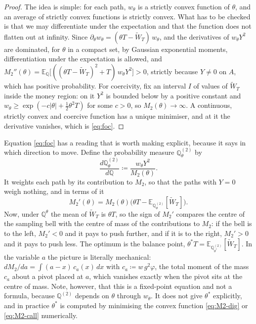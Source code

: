 \documentclass[11pt,a4paper]{article}
\theoremstyle{plain}
\theoremstyle{definition}
\theoremstyle{remark}
\newcommand{\E}{\mathbb{E}}
\newcommand{\Q}{\mathbb{Q}}
\newcommand{\1}{\mathbf{1}}
\newcommand{\eqdef}{\coloneqq}
\newcommand{\Wt}{\widetilde{W}}
\newcommand{\Qt}{\Q^{\theta}}
\begin{document}
\begin{proof}
The idea is simple: for each path, $w_\theta$ is a strictly convex function of $\theta$, and an average of strictly convex functions is strictly convex. What has to be checked is that we may differentiate under the expectation and that the function does not flatten out at infinity. Since $\partial_\theta w_\theta = (\theta T - \Wt_T)\, w_\theta$, and the derivatives of $w_\theta Y^2$ are dominated, for $\theta$ in a compact set, by Gaussian exponential moments, differentiation under the expectation is allowed, and $M_2''(\theta) = \E_\Q\bigl[((\theta T - \Wt_T)^2 + T)\, w_\theta Y^2\bigr] > 0$, strictly because $Y \ne 0$ on $A$, which has positive probability. For coercivity, fix an interval $I$ of values of $\Wt_T$ inside the money region: on it $Y^2$ is bounded below by a positive constant and $w_\theta \ge \exp(-c|\theta| + \tfrac12\theta^2 T)$ for some $c > 0$, so $M_2(\theta) \to \infty$. A continuous, strictly convex and coercive function has a unique minimiser, and at it the derivative vanishes, which is \eqref{eq:foc}.
\end{proof}

Equation \eqref{eq:foc} has a reading that is worth making explicit, because it says in which direction to move. Define the probability measure $\Q^{(2)}_\theta$ by
\[
  \frac{d\Q^{(2)}_\theta}{d\Q} \eqdef \frac{w_\theta Y^2}{M_2(\theta)} .
\]
It weights each path by its contribution to $M_2$, so that the paths with $Y = 0$ weigh nothing, and in terms of it
\[
  M_2'(\theta) = M_2(\theta)\bigl(\theta T - \E_{\Q^{(2)}_\theta}[\Wt_T]\bigr).
\]
Now, under $\Qt$ the mean of $\Wt_T$ is $\theta T$, so the sign of $M_2'$ compares the centre of the sampling bell with the centre of mass of the contributions to $M_2$: if the bell is to the left, $M_2' < 0$ and it pays to push further, and if it is to the right, $M_2' > 0$ and it pays to push less. The optimum is the balance point, $\theta^* T = \E_{\Q^{(2)}_{\theta^*}}[\Wt_T]$. In the variable $a$ the picture is literally mechanical: $dM_2/da = \int (a - x)\, c_a(x)\, dx$ with $c_a \eqdef w\, g^2 \varphi$, the total moment of the mass $c_a$ about a pivot placed at $a$, which vanishes exactly when the pivot sits at the centre of mass. Note, however, that this is a fixed-point equation and not a formula, because $\Q^{(2)}$ depends on $\theta$ through $w_\theta$. It does not give $\theta^*$ explicitly, and in practice $\theta^*$ is computed by minimising the convex function \eqref{eq:M2-dig} or \eqref{eq:M2-call} numerically.
\end{document}
